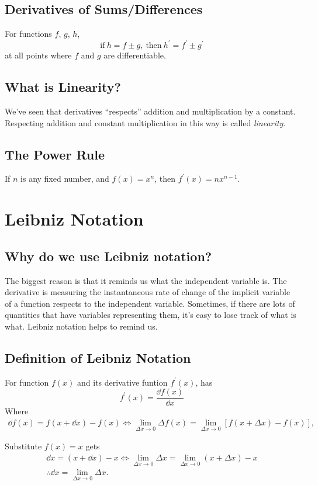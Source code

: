 \subsection{Derivatives of Sums/Differences}
For functions $f$, $g$, $h$,
\[\text{if}\ h=f\pm g,\ \text{then}\ h^\prime=f^\prime\pm g^\prime\]
at all points where $f$ and $g$ are differentiable.

\subsection{What is Linearity?}
We've seen that derivatives ``respects'' addition and multiplication by a constant. Respecting addition and constant multiplication in this way is called \textit{linearity}.

\subsection{The Power Rule}
If $n$ is any fixed number, and $f(x)=x^n$, then $f^\prime(x)=nx^{n-1}$.

\section{Leibniz Notation}
\subsection{Why do we use Leibniz notation?}
The biggest reason is that it reminds us what the independent variable is. The derivative is measuring the instantaneous rate of change of the implicit variable of a function respects to the independent variable. Sometimes, if there are lots of quantities that have variables representing them, it's easy to lose track of what is what. Leibniz notation helps to remind us.

\subsection{Definition of Leibniz Notation}
For function $f(x)$ and its derivative funtion $f^\prime(x)$, has
\[f^\prime(x)=\frac{\dd f(x)}{\dd x}\]
Where
\begin{gather*}
\dd f(x)=f(x+\dd x)-f(x)\iff\lim_{\Delta x\to0}\Delta f(x)=\lim_{\Delta x\to0}[f(x+\Delta x)-f(x)],
\end{gather*}
\begin{corollary}[$\dd x=\svlim_{\Delta x\to0}\Delta x$]
  Substitute $f(x)=x$ gets
  \begin{gather*}
    \dd x=(x+\dd x)-x\iff\lim_{\Delta x\to0}\Delta x=\lim_{\Delta x\to0}(x+\Delta x)-x\\
    \therefore\dd x=\lim_{\Delta x\to0}\Delta x.
  \end{gather*}
\end{corollary}
